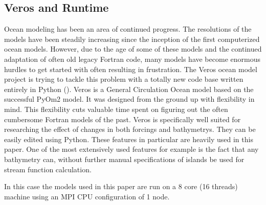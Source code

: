 \subsection{Veros and Runtime}
Ocean modeling has been an area of continued progress. The resolutions of the models have been steadily increasing since the inception of the first computerized ocean models. However, due to the age of some of these models and the continued adaptation of often old legacy Fortran code, many models have become enormous hurdles to get started with often resulting in frustration. The Veros ocean model project is trying to tackle this problem with a totally new code base written entirely in Python (\cite{Hafner2018Aug}). 
Veros is a General Circulation Ocean model based on the successful PyOm2 model. It was designed from the ground up with flexibility in mind. This flexibility cuts valuable time spent on figuring out the often cumbersome Fortran models of the past. Veros is specifically well suited for researching the effect of changes in both forcings and bathymetrys. They can be easily edited using Python. These features in particular are heavily used in this paper. One of the most extensively used features for example is the fact that any bathymetry can, without further manual specifications of islands be used for stream function calculation.

In this case the models used in this paper are run on a 8 core (16 threads) machine using an MPI CPU configuration of 1 node.